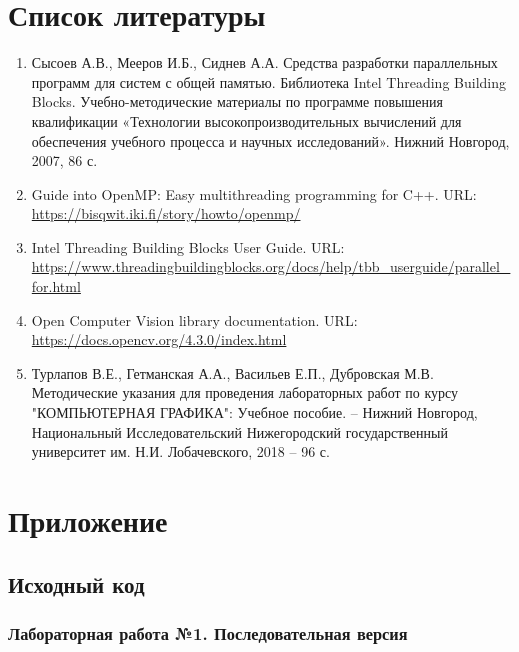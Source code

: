 \documentclass{report}
\begin{document}
    \section*{Список литературы}
    \begin{enumerate}
        \item Сысоев А.В., Мееров И.Б., Сиднев А.А. Средства разработки параллельных программ для систем с общей памятью. Библиотека Intel Threading Building Blocks. Учебно-методические материалы по программе повышения квалификации «Технологии высокопроизводительных вычислений для обеспечения учебного процесса и научных исследований». Нижний Новгород, 2007, 86 с.
        \item Guide into OpenMP: Easy multithreading programming for C++. URL: \url{https://bisqwit.iki.fi/story/howto/openmp/}
        \item Intel Threading Building Blocks User Guide. URL: \url{https://www.threadingbuildingblocks.org/docs/help/tbb_userguide/parallel_for.html}
        \item Open Computer Vision library documentation. URL: \url{https://docs.opencv.org/4.3.0/index.html}
        \item Турлапов В.Е., Гетманская А.А., Васильев Е.П., Дубровская М.В. Методические указания для проведения лабораторных работ по курсу "КОМПЬЮТЕРНАЯ ГРАФИКА": Учебное пособие. – Нижний Новгород, Национальный Исследовательский Нижегородский государственный университет им. Н.И. Лобачевского, 2018 – 96 с.
    \end{enumerate}

    \newpage
    \section*{Приложение}

    \subsection*{Исходный код}

    \subsubsection*{Лабораторная работа №1. Последовательная версия}
    
    
    
\end{document}
